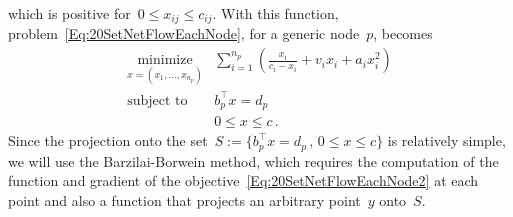 \documentclass[letter,10pt]{article}
\theoremstyle{definition}
\theoremstyle{nonumberplain}
\begin{document}
		which is positive for~$0 \leq x_{ij} \leq c_{ij}$. With this function, problem~\eqref{Eq:20SetNetFlowEachNode}, for a generic node~$p$, becomes
		\begin{equation}\label{Eq:20SetNetFlowEachNode2}
			\begin{array}{cl}
				\underset{x= (x_1,\ldots,x_{n_p})}{\text{minimize}} & \sum_{i=1}^{n_p} (\frac{x_i}{c_i - x_i} + v_i x_i + a_i x_i^2)
				\\
				\text{subject to} & b_p^\top x = d_p \\
				                  & 0 \leq x \leq c\,.
			\end{array}
		\end{equation}
		Since the projection onto the set~$S:=\{b_p^\top x = d_p\,,\, 0\leq x\leq c\}$ is relatively simple, we will use the Barzilai-Borwein method, which requires the computation of the function and gradient of the objective~\eqref{Eq:20SetNetFlowEachNode2} at each point and also a function that projects an arbitrary point~$y$ onto~$S$.
\end{document}
